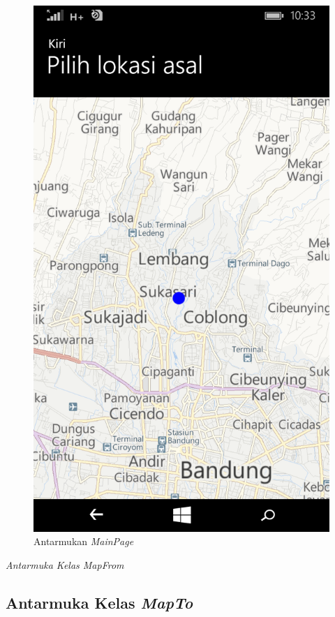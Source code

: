 \begin{figure}[h]
	\centering
		\includegraphics[scale=0.2]{Gambar/antarmuka/map}
	\caption{Antarmukan \textit{MainPage}}
	\label{fig:Antarmuka MainPage}
\end{figure}

\hspace{0.5cm} \textit{Antarmuka Kelas MapFrom} 

\subsection{Antarmuka Kelas \textit{MapTo}}
\label{lab:Antarmuka Kelas MapFrom}

